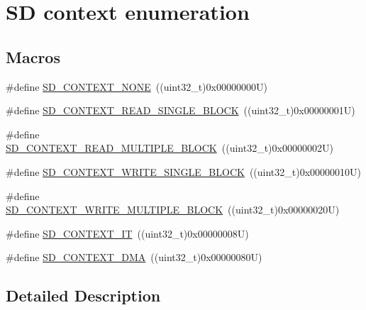\hypertarget{group___s_d___exported___constansts___group2}{}\section{SD context enumeration}
\label{group___s_d___exported___constansts___group2}
\subsection*{Macros}
\begin{DoxyCompactItemize}
\item 
\#define \mbox{\hyperlink{group___s_d___exported___constansts___group2_ga8da25ee0885f5152576a2e30b9a48eec}{S\+D\+\_\+\+C\+O\+N\+T\+E\+X\+T\+\_\+\+N\+O\+NE}}~((uint32\+\_\+t)0x00000000\+U)
\item 
\#define \mbox{\hyperlink{group___s_d___exported___constansts___group2_ga5d3476fe092abf2c581a14c838ff09c8}{S\+D\+\_\+\+C\+O\+N\+T\+E\+X\+T\+\_\+\+R\+E\+A\+D\+\_\+\+S\+I\+N\+G\+L\+E\+\_\+\+B\+L\+O\+CK}}~((uint32\+\_\+t)0x00000001\+U)
\item 
\#define \mbox{\hyperlink{group___s_d___exported___constansts___group2_gaa61f28262391d1a93788ced959f6c6e3}{S\+D\+\_\+\+C\+O\+N\+T\+E\+X\+T\+\_\+\+R\+E\+A\+D\+\_\+\+M\+U\+L\+T\+I\+P\+L\+E\+\_\+\+B\+L\+O\+CK}}~((uint32\+\_\+t)0x00000002\+U)
\item 
\#define \mbox{\hyperlink{group___s_d___exported___constansts___group2_gae5f92c81361f3d0a5327605b7af20300}{S\+D\+\_\+\+C\+O\+N\+T\+E\+X\+T\+\_\+\+W\+R\+I\+T\+E\+\_\+\+S\+I\+N\+G\+L\+E\+\_\+\+B\+L\+O\+CK}}~((uint32\+\_\+t)0x00000010\+U)
\item 
\#define \mbox{\hyperlink{group___s_d___exported___constansts___group2_ga04380a2580109af986adb8e1f743a957}{S\+D\+\_\+\+C\+O\+N\+T\+E\+X\+T\+\_\+\+W\+R\+I\+T\+E\+\_\+\+M\+U\+L\+T\+I\+P\+L\+E\+\_\+\+B\+L\+O\+CK}}~((uint32\+\_\+t)0x00000020\+U)
\item 
\#define \mbox{\hyperlink{group___s_d___exported___constansts___group2_ga3f02bc5815829679f0462a14bdefbb31}{S\+D\+\_\+\+C\+O\+N\+T\+E\+X\+T\+\_\+\+IT}}~((uint32\+\_\+t)0x00000008\+U)
\item 
\#define \mbox{\hyperlink{group___s_d___exported___constansts___group2_ga67aba0576610377f9d05646d89350761}{S\+D\+\_\+\+C\+O\+N\+T\+E\+X\+T\+\_\+\+D\+MA}}~((uint32\+\_\+t)0x00000080\+U)
\end{DoxyCompactItemize}


\subsection{Detailed Description}


